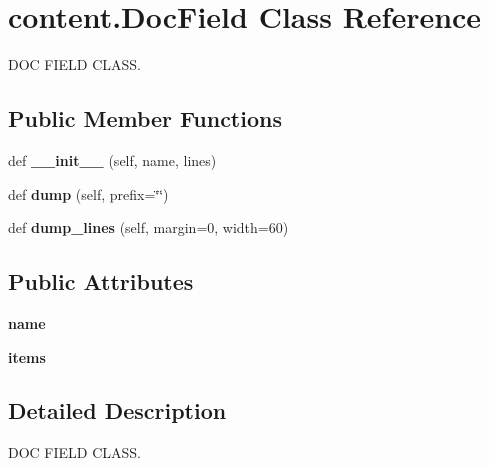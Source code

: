 \hypertarget{classcontent_1_1_doc_field}{}\section{content.\+Doc\+Field Class Reference}
\label{classcontent_1_1_doc_field}


D\+OC F\+I\+E\+LD C\+L\+A\+SS.  


\subsection*{Public Member Functions}
\begin{DoxyCompactItemize}
\item 
\mbox{\label{classcontent_1_1_doc_field_aee545fdf90bdc952d7693a66f2afc5e6}} 
def {\bfseries \+\_\+\+\_\+init\+\_\+\+\_\+} (self, name, lines)
\item 
\mbox{\label{classcontent_1_1_doc_field_a1646f508e018c91739e87ac3a7abfdff}} 
def {\bfseries dump} (self, prefix=\char`\"{}\char`\"{})
\item 
\mbox{\label{classcontent_1_1_doc_field_aa79ed7b61c0c3caed05fcabd33d8c134}} 
def {\bfseries dump\+\_\+lines} (self, margin=0, width=60)
\end{DoxyCompactItemize}
\subsection*{Public Attributes}
\begin{DoxyCompactItemize}
\item 
\mbox{\label{classcontent_1_1_doc_field_ab9296332fc55136afc03f14d5e69dc09}} 
{\bfseries name}
\item 
\mbox{\label{classcontent_1_1_doc_field_af6ffa002c264c725314532a8c207951a}} 
{\bfseries items}
\end{DoxyCompactItemize}


\subsection{Detailed Description}
D\+OC F\+I\+E\+LD C\+L\+A\+SS. 

